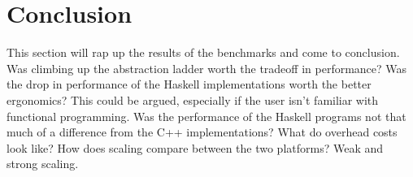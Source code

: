 \documentclass[a4paper, 12pt]{article}
\begin{document}
\section{Conclusion}
This section will rap up the results of the benchmarks and come to conclusion. Was climbing up the
 abstraction ladder worth the tradeoff in performance? Was the drop in performance of the Haskell implementations
 worth the better ergonomics? This could be argued, especially if the user isn't familiar with functional programming.
 Was the performance of the Haskell programs not that much of a difference from the C++ implementations? What do overhead costs look like?
 How does scaling compare between the two platforms? Weak and strong scaling.
\end{document}
